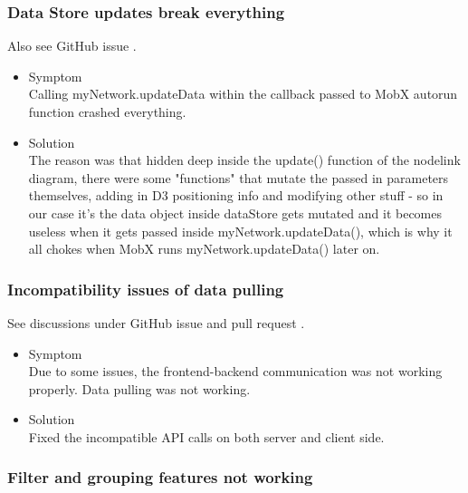 \documentclass[oneside, english, final]{design}
\begin{document}
\subsubsection{Data Store updates break everything}

Also see GitHub issue \href{https://github.com/DHSTTOS/implementation/issues/69}{\color{blue}{\#69}}.

\begin{itemize}
      \item{Symptom
            \\
            Calling myNetwork.updateData within the callback passed to MobX autorun function crashed everything.}

      \item{Solution
            \\
            The reason was that hidden deep inside the update() function of the nodelink diagram, there were some "functions" that mutate the passed in parameters themselves, adding in D3 positioning info and modifying other stuff - so in our case it's the data object inside dataStore gets mutated and it becomes useless when it gets passed inside myNetwork.updateData(), which is why it all chokes when MobX runs myNetwork.updateData() later on.
            }
\end{itemize}

\subsubsection{Incompatibility issues of data pulling}

See discussions under GitHub issue \href{https://github.com/DHSTTOS/implementation/issues/69}{\color{blue}{\#69}} and pull request \href{https://github.com/DHSTTOS/implementation/issues/78}{\color{blue}{\#78}}.

\begin{itemize}
      \item{Symptom
            \\
            Due to some issues, the frontend-backend communication was not working properly. Data pulling was not working.}

      \item{Solution
            \\
            Fixed the incompatible API calls on both server and client side.
            }
\end{itemize}

\subsubsection{Filter and grouping features not working}
\end{document}

